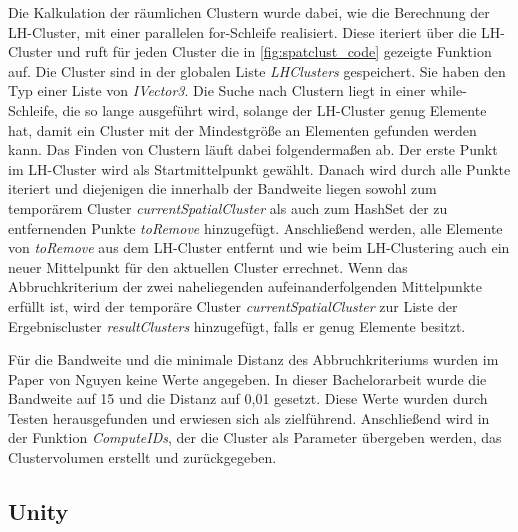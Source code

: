 Die Kalkulation der räumlichen Clustern wurde dabei, wie die Berechnung der LH-Cluster, mit einer parallelen for-Schleife realisiert. Diese iteriert über die LH-Cluster und ruft für jeden Cluster die in \autoref{fig:spatclust_code} gezeigte Funktion auf. Die Cluster sind in der globalen Liste \textit{LHClusters} gespeichert. Sie haben den Typ einer Liste von \textit{IVector3}. 
\newline
Die Suche nach Clustern liegt in einer while-Schleife, die so lange ausgeführt wird, solange der LH-Cluster genug Elemente hat, damit ein Cluster mit der Mindestgröße an Elementen gefunden werden kann. 
\newline
Das Finden von Clustern läuft dabei folgendermaßen ab. Der erste Punkt im LH-Cluster wird als Startmittelpunkt gewählt. Danach wird durch alle Punkte iteriert und diejenigen die innerhalb der Bandweite liegen sowohl zum temporärem Cluster \textit{currentSpatialCluster} als auch zum HashSet der zu entfernenden Punkte \textit{toRemove} hinzugefügt.
\newline
Anschließend werden, alle Elemente von \textit{toRemove} aus dem LH-Cluster entfernt und wie beim LH-Clustering auch ein neuer Mittelpunkt für den aktuellen Cluster errechnet.
\newline
Wenn das Abbruchkriterium der zwei naheliegenden aufeinanderfolgenden Mittelpunkte erfüllt ist, wird der temporäre Cluster \textit{currentSpatialCluster} zur Liste der Ergebniscluster \textit{resultClusters} hinzugefügt, falls er genug Elemente besitzt.


Für die Bandweite und die minimale Distanz des Abbruchkriteriums wurden im Paper von Nguyen \cite{nguyen2012clustering} keine Werte angegeben. In dieser Bachelorarbeit wurde die Bandweite auf 15 und die Distanz auf 0,01 gesetzt. Diese Werte wurden durch Testen herausgefunden und erwiesen sich als zielführend.
\newline
Anschließend wird in der Funktion \textit{ComputeIDs}, der die Cluster als Parameter übergeben werden, das Clustervolumen erstellt und zurückgegeben.



\subsection{Unity}

